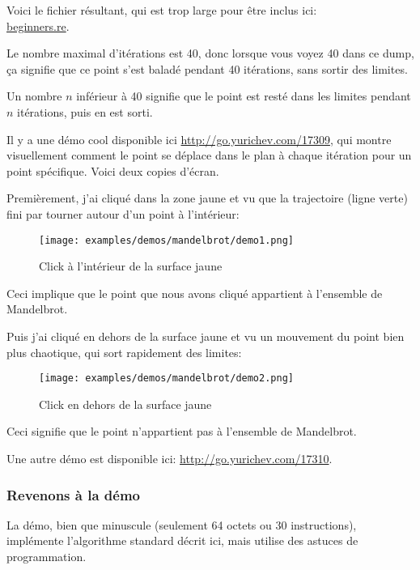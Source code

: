 

Voici le fichier résultant, qui est trop large pour être inclus ici:\\
\href{http://go.yurichev.com/17164}{beginners.re}.

Le nombre maximal d'itérations est 40, donc lorsque vous voyez 40 dans ce dump, ça
signifie que ce point s'est baladé pendant 40 itérations, sans sortir des limites.

Un nombre $n$ inférieur à 40 signifie que le point est resté dans les limites pendant
$n$ itérations, puis en est sorti.

\clearpage
Il y a une démo cool disponible ici \url{http://go.yurichev.com/17309}, qui montre
visuellement comment le point se déplace dans le plan à chaque itération pour un
point spécifique.
Voici deux copies d'écran.

%
Premièrement, j'ai cliqué dans la zone jaune et vu que la trajectoire (ligne verte)
fini par tourner autour d'un point à l'intérieur:

\begin{figure}[H]
\centering
\texttt{[image: examples/demos/mandelbrot/demo1.png]}
\caption{Click à l'intérieur de la surface jaune}
\end{figure}


Ceci implique que le point que nous avons cliqué appartient à l'ensemble de Mandelbrot.

\clearpage

Puis j'ai cliqué en dehors de la surface jaune et vu un mouvement du point bien plus
chaotique, qui sort rapidement des limites:

\begin{figure}[H]
\centering
\texttt{[image: examples/demos/mandelbrot/demo2.png]}
\caption{Click en dehors de la surface jaune}
\end{figure}

Ceci signifie que le point n'appartient pas à l'ensemble de Mandelbrot.

Une autre démo est disponible ici:
\url{http://go.yurichev.com/17310}.

\clearpage
\subsubsection{Revenons à la démo}


La démo, bien que minuscule (seulement 64 octets ou 30 instructions), implémente
l'algorithme standard décrit ici, mais utilise des astuces de programmation.

